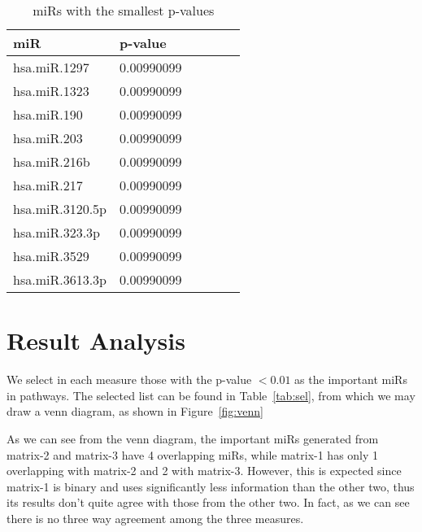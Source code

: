 \documentclass{scrartcl}
\numberwithin{figure}{section}
\numberwithin{table}{section}
\begin{document}
\begin{table}[h!]
  \centering
  \caption{miRs with the smallest p-values}
  \label{tab:pval}
\bigskip
  \begin{tabular}{llllll}
    \toprule
    miR             & p-value    \\
    \midrule
    hsa.miR.1297    & 0.00990099 \\
    hsa.miR.1323    & 0.00990099 \\
    hsa.miR.190     & 0.00990099 \\
    hsa.miR.203     & 0.00990099 \\
    hsa.miR.216b    & 0.00990099 \\
    hsa.miR.217     & 0.00990099 \\
    hsa.miR.3120.5p & 0.00990099 \\
    hsa.miR.323.3p  & 0.00990099 \\
    hsa.miR.3529    & 0.00990099 \\
    hsa.miR.3613.3p & 0.00990099 \\
    \bottomrule
  \end{tabular}
\end{table}

\section{Result Analysis}

We select in each measure those with the p-value $<0.01$ as the important miRs
in pathways.  The selected list can be found in Table~\ref{tab:sel}, from which
we may draw a venn diagram, as shown in Figure~\ref{fig:venn}

As we can see from the venn diagram, the important miRs generated from matrix-2
and matrix-3 have 4 overlapping miRs, while matrix-1 has only 1 overlapping with
matrix-2 and 2 with matrix-3. However, this is expected since matrix-1 is
binary and uses significantly less information than the other two, thus its
results don't quite agree with those from the other two. In fact, as we can see
there is no three way agreement among the three measures.
\end{document}
